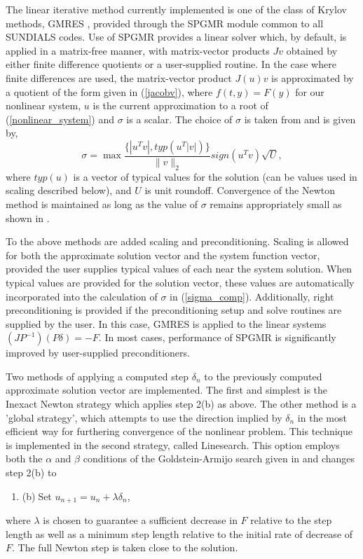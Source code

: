 The linear iterative method currently implemented is one of the class of 
Krylov methods, GMRES \cite{BrHi:89,SaSc:86}, 
provided through the SPGMR module common to all SUNDIALS codes. 
Use of SPGMR provides a linear solver which, by default, is applied in a 
matrix-free manner, with matrix-vector products $Jv$ obtained by either 
finite difference quotients or a user-supplied routine.
In the case where finite differences are used, 
the matrix-vector product $J(u)v$ is approximated by a quotient of the form
given in (\ref{jacobv}),
where $f(t, y) = F(y)$ for our nonlinear system, 
$u$ is the current approximation to a root of (\ref{nonlinear_system}) 
and $\sigma$ is a scalar.  The choice of $\sigma$ is taken from 
\cite{BrSa:90} and is given by,
\begin{equation}
\sigma = \max\frac{\{|u^T v|, typ(u^T |v|)\}}{\|v\|_2} sign(u^T v) 
\sqrt{U},
\label{sigma_comp}
\end{equation}
where $typ(u)$ is a vector of typical values for the solution (can be 
values used in scaling described below), and $U$ is unit roundoff.
Convergence of the Newton method is maintained as long as the value
of $\sigma$ remains appropriately small as shown in \cite{Bro:87}.

To the above methods are added scaling and preconditioning. Scaling is allowed
for both the approximate solution vector and the system function vector, 
provided the user supplies typical values of each near the system solution.
When typical values are provided for the solution vector, these values are 
automatically incorporated into the calculation of $\sigma$ in
(\ref{sigma_comp}).
Additionally, right preconditioning is provided if the preconditioning 
setup and solve routines are supplied by the user.  In this case,
GMRES is applied to the linear systems $(JP^{-1})(P\delta) = -F$.
In most cases, performance of SPGMR is significantly improved by user-supplied 
preconditioners.  

Two methods of applying a computed step $\delta_n$ to the previously computed
approximate solution vector are implemented.  The 
first and simplest is the Inexact Newton strategy which applies step 2(b) 
as above.  
The other method is a 'global strategy',
which attempts to use the direction implied by $\delta_n$ 
in the most efficient way for furthering convergence of the nonlinear problem. 
This technique 
is implemented in the second strategy, called Linesearch.  This option
employs both the $\alpha$ and $\beta$ conditions of the Goldstein-Armijo
search given in \cite{DeSc:96} and changes step 2(b) to
\begin{enumerate}
\addtocounter{enumi}{1}
\item{(b)$\;$Set $u_{n+1} = u_n + \lambda \delta_n$},
\end{enumerate}
where $\lambda$ is chosen to guarantee a sufficient decrease in $F$ 
relative to the step length as well as a minimum step length relative 
to the initial rate of decrease of $F$.  The full Newton step is taken
close to the solution.


